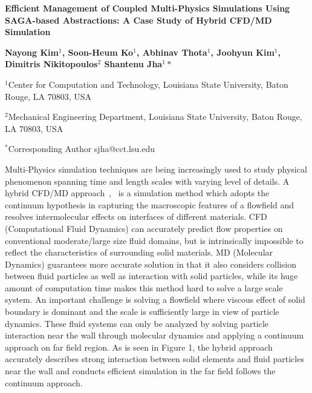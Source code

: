 \documentclass[a4paper]{article}
\newcommand{\Nkimnote}[1]{ {\textcolor{green} { ***Nkim: #1 }}}
\newcommand{\Nkimnote}[1]{}
\begin{document}
\begin{center}


\textbf {\large \bf Efficient Management of Coupled Multi-Physics Simulations
Using SAGA-based Abstractions: A Case Study of  Hybrid CFD/MD Simulation}
\vspace{12pt}

\textbf {\normalsize \hspace{0.6 in} Nayong Kim$^1$, Soon-Heum Ko$^1$, Abhinav Thota$^1$, Joohyun Kim$^1$,   \newline Dimitris Nikitopoulos$^2$    Shantenu Jha$^1*$ }

\vspace{10pt}

\normalsize { \hspace{0.6 in} $^1$Center for Computation and Technology, \newline Louisiana State University, Baton Rouge, LA 70803, USA}

\normalsize {\hspace{0.6 in} $^2$Mechanical Engineering Department, \newline Louisiana State University, Baton Rouge, LA 70803, USA}

\vspace{4pt}
\footnotesize {\hspace{0.0 in} $^*$Corresponding Author sjha@cct.lsu.edu}


\vspace{6pt}

\end{center}

Multi-Physics simulation techniques are being increasingly used to study physical phenomenon spanning time and length scales with varying level of details.  A hybrid CFD/MD approach~\cite{Nie:2004},~\cite{Yen:2007} is a simulation method which adopts the continuum hypothesis in capturing the macroscopic features of a flowfield and resolves intermolecular effects on interfaces of different materials. CFD (Computational Fluid Dynamics) can accurately predict flow properties on conventional moderate/large size fluid domains, but is intrinsically impossible to reflect the characteristics of surrounding solid materials. MD (Molecular Dynamics) guarantees more accurate solution in that it also considers collision between fluid particles as well as interaction with solid particles, while its huge amount of computation time makes this method hard to solve a large scale system. An important challenge is solving a flowfield where viscous effect of solid boundary is dominant and the scale is sufficiently large in view of particle dynamics. These fluid systems can only be analyzed by solving particle interaction near the wall through molecular dynamics and applying a continuum approach on far field region. As is seen in Figure 1, the hybrid approach accurately describes strong interaction between solid elements and fluid particles near the wall and conducts efficient simulation in the far field follows the continuum approach.
\end{document}
